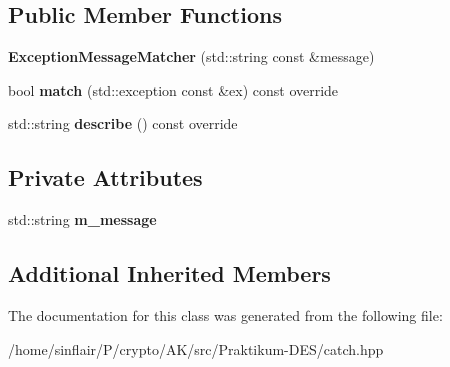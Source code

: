 \subsection*{Public Member Functions}
\begin{DoxyCompactItemize}
\item 
\mbox{\label{classCatch_1_1Matchers_1_1Exception_1_1ExceptionMessageMatcher_ace55942f39ba653db3fd69d6d90e188f}} 
{\bfseries Exception\+Message\+Matcher} (std\+::string const \&message)
\item 
\mbox{\label{classCatch_1_1Matchers_1_1Exception_1_1ExceptionMessageMatcher_aa0566d24990d69e96495360b8f79593d}} 
bool {\bfseries match} (std\+::exception const \&ex) const override
\item 
\mbox{\label{classCatch_1_1Matchers_1_1Exception_1_1ExceptionMessageMatcher_a3543441985ec877a781e660a403b1bae}} 
std\+::string {\bfseries describe} () const override
\end{DoxyCompactItemize}
\subsection*{Private Attributes}
\begin{DoxyCompactItemize}
\item 
\mbox{\label{classCatch_1_1Matchers_1_1Exception_1_1ExceptionMessageMatcher_a1cf4836834c357febac9180ab74a178a}} 
std\+::string {\bfseries m\+\_\+message}
\end{DoxyCompactItemize}
\subsection*{Additional Inherited Members}


The documentation for this class was generated from the following file\+:\begin{DoxyCompactItemize}
\item 
/home/sinflair/\+P/crypto/\+A\+K/src/\+Praktikum-\/\+D\+E\+S/catch.\+hpp\end{DoxyCompactItemize}
